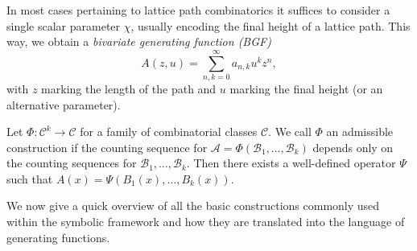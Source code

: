 \begin{remark}
  In most cases pertaining to lattice path combinatorics it suffices to consider a single scalar parameter $\chi$, usually encoding the final height of a lattice path. This way, we obtain a \textit{bivariate generating function (BGF)}
  $$
    A(z,u) = \sum_{n,k = 0}^\infty a_{n,k} u^k z^n,
  $$
  with $z$ marking the length of the path and $u$ marking the final height (or an alternative parameter).
\end{remark}

\begin{definition}
  Let $\Phi: \mathcal{C}^k \to \mathcal{C}$ for a family of combinatorial classes $\mathcal{C}$. We call $\Phi$ an admissible construction if the counting sequence for $\mathcal{A} = \Phi(\mathcal{B}_1,\dots,\mathcal{B}_k)$ depends only on the counting sequences for $\mathcal{B}_1,\dots,\mathcal{B}_k.$ Then there exists a well-defined operator $\Psi$ such that $A(x) = \Psi(B_1(x),\dots,B_k(x)).$
\end{definition}

We now give a quick overview of all the basic constructions commonly used within the symbolic framework and how they are translated into the language of generating functions.

